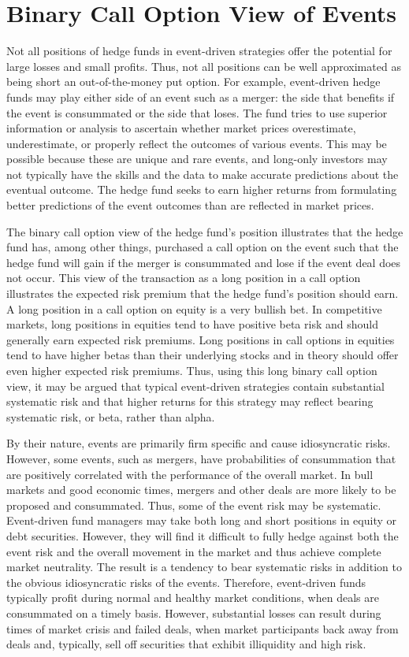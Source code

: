 \documentclass[11pt]{article}
\begin{document}
\section*{Binary Call Option View of Events}
Not all positions of hedge funds in event-driven strategies offer the potential for large losses and small profits. Thus, not all positions can be well approximated as being short an out-of-the-money put option. For example, event-driven hedge funds may play either side of an event such as a merger: the side that benefits if the event is consummated or the side that loses. The fund tries to use superior information or analysis to ascertain whether market prices overestimate, underestimate, or properly reflect the outcomes of various events. This may be possible because these are unique and rare events, and long-only investors may not typically have the skills and the data to make accurate predictions about the eventual outcome. The hedge fund seeks to earn higher returns from formulating better predictions of the event outcomes than are reflected in market prices.

The binary call option view of the hedge fund's position illustrates that the hedge fund has, among other things, purchased a call option on the event such that the hedge fund will gain if the merger is consummated and lose if the event deal does not occur. This view of the transaction as a long position in a call option illustrates the expected risk premium that the hedge fund's position should earn. A long position in a call option on equity is a very bullish bet. In competitive markets, long positions in equities tend to have positive beta risk and should generally earn expected risk premiums. Long positions in call options in equities tend to have higher betas than their underlying stocks and in theory should offer even higher expected risk premiums. Thus, using this long binary call option view, it may be argued that typical event-driven strategies contain substantial systematic risk and that higher returns for this strategy may reflect bearing systematic risk, or beta, rather than alpha.

By their nature, events are primarily firm specific and cause idiosyncratic risks. However, some events, such as mergers, have probabilities of consummation that are positively correlated with the performance of the overall market. In bull markets and good economic times, mergers and other deals are more likely to be proposed and consummated. Thus, some of the event risk may be systematic. Event-driven fund managers may take both long and short positions in equity or debt securities. However, they will find it difficult to fully hedge against both the event risk and the overall movement in the market and thus achieve complete market neutrality. The result is a tendency to bear systematic risks in addition to the obvious idiosyncratic risks of the events. Therefore, event-driven funds typically profit during normal and healthy market conditions, when deals are consummated on a timely basis. However, substantial losses can result during times of market crisis and failed deals, when market participants back away from deals and, typically, sell off securities that exhibit illiquidity and high risk.
\end{document}

